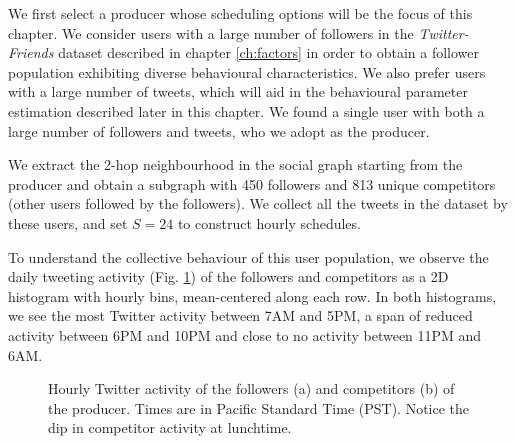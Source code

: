 \documentclass[onesided,asymmetric]{tufte-book}
\begin{document}
\newpage

We first select a producer whose scheduling options will be the focus of this chapter. We consider users with a large number of followers in the \textit{Twitter-Friends} dataset described in chapter \ref{ch:factors} in order to obtain a follower population exhibiting diverse behavioural characteristics. We also prefer users with a large number of tweets, which will aid in the behavioural parameter estimation described later in this chapter. We found a single user with both a large number of followers and tweets, who we adopt as the producer.

We extract the 2-hop neighbourhood in the social graph starting from the producer and obtain a subgraph with 450 followers and 813 unique competitors (other users followed by the followers). We collect all the tweets in the dataset by these users, and set $S = 24$ to construct hourly schedules.

To understand the collective behaviour of this user population, we observe the daily tweeting activity (Fig. \ref{fig:follower-competitor}) of the followers and competitors as a 2D histogram with hourly bins, mean-centered along each row. In both histograms, we see the most Twitter activity between 7AM and 5PM, a span of reduced activity between 6PM and 10PM and close to no activity between 11PM and 6AM.
\\[2pc]

\begin{figure}
    \caption[Hourly Twitter activity of followers and competitors.]{Hourly Twitter activity of the followers (a) and competitors (b) of the producer. Times are in Pacific Standard Time (PST). Notice the dip in competitor activity at lunchtime.}
    \label{fig:follower-competitor}
\end{figure}
\end{document}
